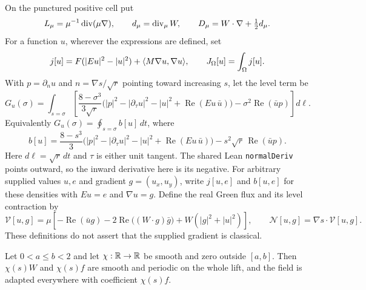 \begin{definition}
\label{def:dd-virial-densities}
\leanok
On the punctured positive cell put
\[
 L_\mu=\mu^{-1}\operatorname{div}(\mu\nabla),\qquad
 d_\mu=\operatorname{div}_\mu W,\qquad D_\mu=W\cdot\nabla+\tfrac12d_\mu.
\]
For a function $u$, wherever the expressions are defined, set
\[
 j[u]=F(|Eu|^2-|u|^2)+\langle M\nabla u,\nabla u\rangle,\qquad
 J_\Omega[u]=\int_\Omega j[u].
\]
With $p=\partial_nu$ and $n=\nabla s/\sqrt r$ pointing toward increasing $s$,
let the level term be
\[
 G_u(\sigma)=\int_{s=\sigma}\left[
 \frac{8-\sigma^3}{3\sqrt r}
 \bigl(|p|^2-|\partial_\tau u|^2-|u|^2+
             \operatorname{Re}(Eu\,\bar u)\bigr)
 -\sigma^2\operatorname{Re}(\bar u p)\right]d\ell.
\]
Equivalently $G_u(\sigma)=\oint_{s=\sigma}b[u]\,dt$, where
\[
 b[u]=\frac{8-s^3}{3}
 \bigl(|p|^2-|\partial_\tau u|^2-|u|^2+
             \operatorname{Re}(Eu\,\bar u)\bigr)
 -s^2\sqrt r\,\operatorname{Re}(\bar u p).
\]
Here $d\ell=\sqrt r\,dt$ and $\tau$ is either unit tangent. The shared Lean
\texttt{normalDeriv} points outward, so the inward derivative here is its negative.
For arbitrary supplied values $u,e$ and gradient $g=(u_x,u_y)$, write
$j[u,e]$ and $b[u,e]$ for these densities with $Eu=e$ and $\nabla u=g$.
Define the real Green flux and its level contraction by
\[
 \mathcal V[u,g]=\mu\left[-\operatorname{Re}(\bar u g)
 -2\operatorname{Re}\bigl((W\cdot g)\bar g\bigr)
 +W(|g|^2+|u|^2)\right],\qquad
 \mathcal N[u,g]=\nabla s\cdot\mathcal V[u,g].
\]
These definitions do not assert that the supplied gradient is classical.
\end{definition}

\begin{lemma}
\label{lem:dd-field-annulus}
\leanok
Let $0<a\le b<2$ and let $\chi:\mathbb{R}\to\mathbb{R}$ be smooth and zero outside $[a,b]$.
Then $\chi(s)W$ and $\chi(s)f$ are smooth and periodic on the whole lift,
and the field is adapted everywhere with coefficient $\chi(s)f$.
\end{lemma}

